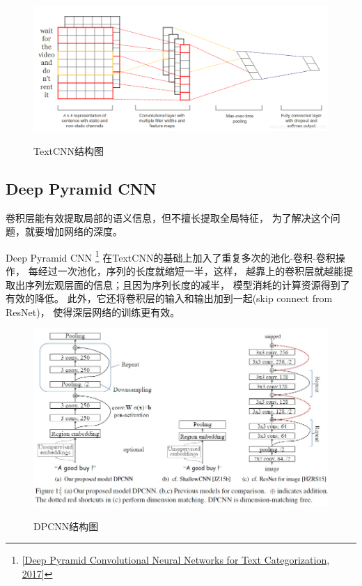 \documentclass[12pt, UTF8, a4paper]{ctexart}
\begin{document}
\begin{figure}[htb]
    \centering
    \includegraphics[width=5in, keepaspectratio]{./pic/cnn.png}\\
    \caption{TextCNN结构图}
\end{figure}

\subsection{Deep Pyramid CNN}

卷积层能有效提取局部的语义信息，但不擅长提取全局特征，
为了解决这个问题，就要增加网络的深度。

Deep Pyramid CNN
\footnote{\href{https://www.aclweb.org/anthology/P17-1052.pdf}
{[Deep Pyramid Convolutional Neural Networks for Text Categorization, 2017]}}
在TextCNN的基础上加入了重复多次的池化-卷积-卷积操作，
每经过一次池化，序列的长度就缩短一半，这样，
越靠上的卷积层就越能提取出序列宏观层面的信息；且因为序列长度的减半，
模型消耗的计算资源得到了有效的降低。
此外，它还将卷积层的输入和输出加到一起(skip connect from ResNet)，
使得深层网络的训练更有效。

\begin{figure}[htb]
    \centering
    \includegraphics[width=5in, keepaspectratio]{./pic/dpcnn.png}\\
    \caption{DPCNN结构图}
\end{figure}
\end{document}
